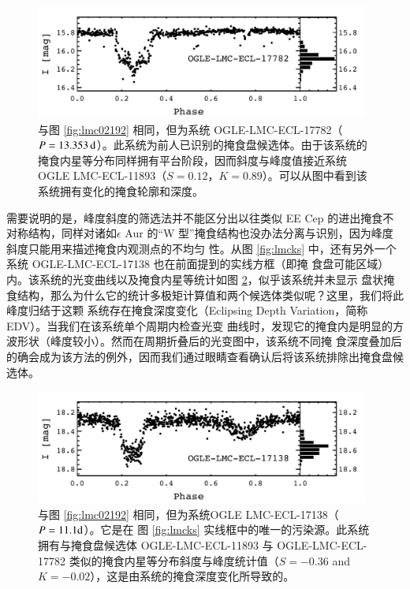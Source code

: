 \begin{figure}[ht!]
\centering
\includegraphics[width=0.98\textwidth,trim={0.0in 0.2in 0 0}]{figures/chapter3/f9_lmc11782.pdf}
\caption[与图 \ref{fig:lmc02192} 相同，但为系统 OGLE-LMC-ECL-17782（$P=13.353\,\tif{d}$）。此系统为前人已识别的掩食盘候选体。由于该系统的掩食内星等分布同样拥有平台阶段，因而斜度与峰度值接近系统 OGLE LMC-ECL-11893（$S=0.12$，$K=0.89$）。可以从图中看到该系统拥有变化的掩食轮廓和深度。]{与图 \ref{fig:lmc02192} 相同，但为系统 OGLE-LMC-ECL-17782（$P=13.353\,\tif{d}$）。此系统为前人已识别的掩食盘候选体\cite{Graczyk2011}。由于该系统的掩食内星等分布同样拥有平台阶段，因而斜度与峰度值接近系统 OGLE LMC-ECL-11893（$S=0.12$，$K=0.89$）。可以从图中看到该系统拥有变化的掩食轮廓和深度。}
\label{fig:lmc11782}
\end{figure}


需要说明的是，峰度斜度的筛选法并不能区分出以往类似 EE Cep 的进出掩食不对称结构，同样对诸如$
\epsilon$ Aur 的“W 型”掩食结构也没办法分离与识别，因为峰度斜度只能用来描述掩食内观测点的不均匀
性。从图 \ref{fig:lmcks} 中，还有另外一个系统 OGLE-LMC-ECL-17138 也在前面提到的实线方框（即掩
食盘可能区域）内。该系统的光变曲线以及掩食内星等统计如图 \ref{fig:lmc17138}，似乎该系统并未显示
盘状掩食结构，那么为什么它的统计多极矩计算值和两个候选体类似呢？这里，我们将此峰度归结于这颗
系统存在掩食深度变化（Eclipsing Depth Variation，简称 EDV）。当我们在该系统单个周期内检查光变
曲线时，发现它的掩食内是明显的方波形状（峰度较小）。然而在周期折叠后的光变图中，该系统不同掩
食深度叠加后的确会成为该方法的例外，因而我们通过眼睛查看确认后将该系统排除出掩食盘候选体。

\begin{figure}[t]
\centering
\includegraphics[width=0.98\textwidth,trim={0.0in 0.2in 0 0}]{figures/chapter3/f10_lmc17138.pdf}
\caption{与图 \ref{fig:lmc02192} 相同，但为系统OGLE LMC-ECL-17138（$P = 11.1 \mathrm{d}$）。它是在 图 \ref{fig:lmcks} 实线框中的唯一的污染源。此系统拥有与掩食盘候选体 OGLE-LMC-ECL-11893 与 OGLE-LMC-ECL-17782 类似的掩食内星等分布斜度与峰度统计值（$S=-0.36$ and $K=-0.02$），这是由系统的掩食深度变化所导致的。}
\label{fig:lmc17138}
\end{figure}


